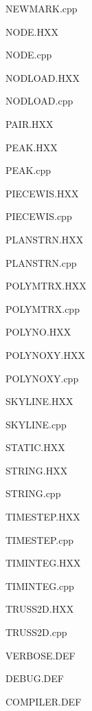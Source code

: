\documentclass{article}
\begin{document}

{\centering\sf  NEWMARK.cpp\\}

% 
{\centering\sf  NODE.HXX\\}

{\centering\sf  NODE.cpp\\}

% 
{\centering\sf  NODLOAD.HXX\\}

{\centering\sf  NODLOAD.cpp\\}

% 
{\centering\sf  PAIR.HXX\\}

% 
{\centering\sf  PEAK.HXX\\}

{\centering\sf  PEAK.cpp\\}

% 
{\centering\sf  PIECEWIS.HXX\\}

{\centering\sf  PIECEWIS.cpp\\}

% 
{\centering\sf  PLANSTRN.HXX\\}

{\centering\sf  PLANSTRN.cpp\\}

% 
{\centering\sf  POLYMTRX.HXX\\}

{\centering\sf  POLYMTRX.cpp\\}

% 
{\centering\sf  POLYNO.HXX\\}

% 
{\centering\sf  POLYNOXY.HXX\\}

{\centering\sf  POLYNOXY.cpp\\}

% 
{\centering\sf  SKYLINE.HXX\\}

{\centering\sf  SKYLINE.cpp\\}

% 
{\centering\sf  STATIC.HXX\\}

% 
% 
{\centering\sf  STRING.HXX\\}

{\centering\sf  STRING.cpp\\}

% 
{\centering\sf  TIMESTEP.HXX\\}

{\centering\sf  TIMESTEP.cpp\\}

% 
{\centering\sf  TIMINTEG.HXX\\}

{\centering\sf  TIMINTEG.cpp\\}

% 
{\centering\sf  TRUSS2D.HXX\\}

{\centering\sf  TRUSS2D.cpp\\}

% 
{\centering\sf  VERBOSE.DEF\\}

{\centering\sf  DEBUG.DEF\\}

{\centering\sf  COMPILER.DEF\\}

\end{document}
